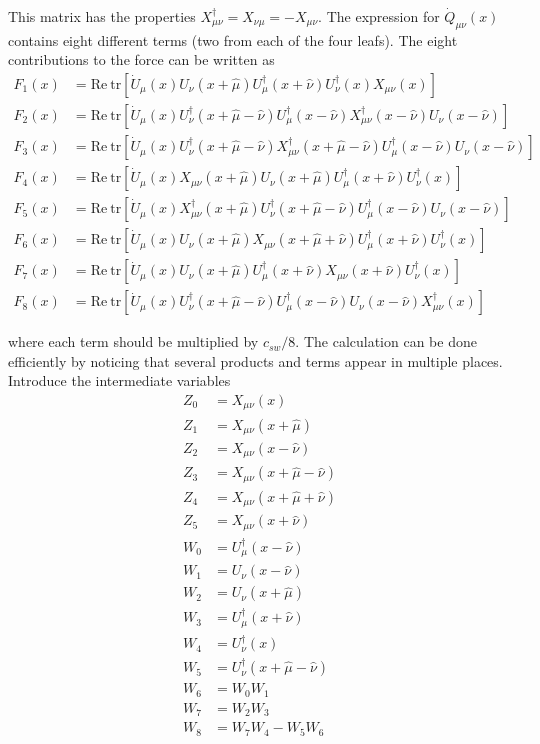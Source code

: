 \documentclass[12pt]{article}
\newcommand{\tr}{\mathrm{tr}}
\newcommand{\re}{\mathrm{Re}}
\begin{document}
This matrix has the properties $X_{\mu\nu}^\dagger=X_{\nu\mu}=-X_{\mu\nu}$. The expression for $\dot{Q}_{\mu\nu}(x)$ contains eight different terms (two from each of the four leafs). The eight contributions to the force can be written as
\begin{align}
 F_1(x) &=
 \re~\tr[\dot{U}_\mu(x)U_\nu(x+\hat{\mu})U_\mu^\dagger(x+\hat{\nu})U_\nu^\dagger(x)X_{\mu\nu}(x)] \\
 F_2(x) &=
 \re~\tr[\dot{U}_\mu(x)U_\nu^\dagger(x+\hat{\mu}-\hat{\nu})U_\mu^\dagger(x-\hat{\nu})X_{\mu\nu}^\dagger(x-\hat{\nu})U_\nu(x-\hat{\nu})] \\
 F_3(x) &=
 \re~\tr[\dot{U}_\mu(x)U_\nu^\dagger(x+\hat{\mu}-\hat{\nu})X_{\mu\nu}^\dagger(x+\hat{\mu}-\hat{\nu})U_\mu^\dagger(x-\hat{\nu})U_\nu(x-\hat{\nu})] \\
 F_4(x) &=
 \re~\tr[\dot{U}_\mu(x)X_{\mu\nu}(x+\hat{\mu})U_\nu(x+\hat{\mu})U_\mu^\dagger(x+\hat{\nu})U_\nu^\dagger(x)] \\
 F_5(x) &=
 \re~\tr[\dot{U}_\mu(x)X_{\mu\nu}^\dagger(x+\hat{\mu})U_\nu^\dagger(x+\hat{\mu}-\hat{\nu})U_\mu^\dagger(x-\hat{\nu})U_\nu(x-\hat{\nu})] \\
 F_6(x) &=
 \re~\tr[\dot{U}_\mu(x)U_\nu(x+\hat{\mu})X_{\mu\nu}(x+\hat{\mu}+\hat{\nu})U_\mu^\dagger(x+\hat{\nu})U_\nu^\dagger(x)] \\
 F_7(x) &=
 \re~\tr[\dot{U}_\mu(x)U_\nu(x+\hat{\mu})U_\mu^\dagger(x+\hat{\nu})X_{\mu\nu}(x+\hat{\nu})U_\nu^\dagger(x)] \\
 F_8(x) &=
 \re~\tr[\dot{U}_\mu(x)U_\nu^\dagger(x+\hat{\mu}-\hat{\nu})U_\mu^\dagger(x-\hat{\nu})U_\nu(x-\hat{\nu})X_{\mu\nu}^\dagger(x)]
\end{align}

where each term should be multiplied by $c_{sw}/8$. The calculation can be done efficiently by noticing that several products and terms appear in multiple places. Introduce the intermediate variables
\begin{align}
 Z_0 &= X_{\mu\nu}(x) \\
 Z_1 &= X_{\mu\nu}(x+\hat{\mu}) \\
 Z_2 &= X_{\mu\nu}(x-\hat{\nu}) \\
 Z_3 &= X_{\mu\nu}(x+\hat{\mu}-\hat{\nu}) \\
 Z_4 &= X_{\mu\nu}(x+\hat{\mu}+\hat{\nu}) \\
 Z_5 &= X_{\mu\nu}(x+\hat{\nu}) \\
 W_0 &= U_\mu^\dagger(x-\hat{\nu}) \\
 W_1 &= U_\nu(x-\hat{\nu}) \\
 W_2 &= U_\nu(x+\hat{\mu}) \\
 W_3 &= U_\mu^\dagger(x+\hat{\nu}) \\
 W_4 &= U_\nu^\dagger(x) \\
 W_5 &= U_\nu^\dagger(x+\hat{\mu}-\hat{\nu}) \\
 W_6 &= W_0W_1 \\
 W_7 &= W_2W_3 \\
 W_8 &= W_7W_4-W_5W_6
\end{align}
\end{document}
